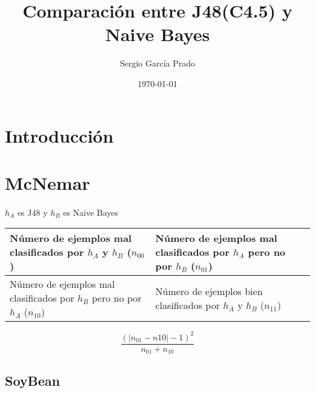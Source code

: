 \documentclass[10pt, a4paper,spanish]{article}
\title{\vspace{-15mm}\fontsize{24pt}{10pt}\selectfont\textbf{Comparación entre J48(C4.5) y Naive Bayes}} %
\author{Sergio García Prado}
\date{\today}
\begin{document}
	\maketitle %

	\thispagestyle{fancy} %


	\begin{abstract}
		\noindent
	\end{abstract}


	\section{Introducción}
        \paragraph{}


	\section{McNemar}

        \paragraph{}
		$h_A$ es J48 y  $h_B$ es Naive Bayes

		\center
		\begin{tabular}{ | p{6cm} | p{6cm} | }
			\hline
				Número de ejemplos mal clasificados por $h_A$  y $h_B$ ($n_{00}$) &
				Número de ejemplos mal clasificados por $h_A$  pero no por $h_B$ ($n_{01}$) \\ \hline

				Número de ejemplos mal clasificados por $h_B$ pero no por $h_A$ ($n_{10}$) &
				Número de ejemplos bien clasificados por $h_A$  y $h_B$ ($n_{11}$)\\
			\hline
		\end{tabular}


		\[
		\frac{(|n_{01}-n{10}|-1)^2}{n_{01}+n_{10}}
		\]


		\subsection{SoyBean}
\end{document}
